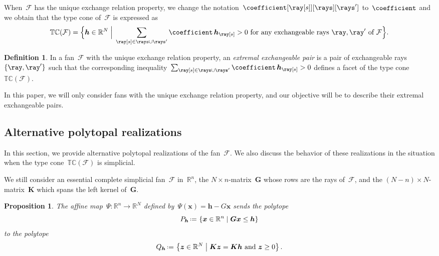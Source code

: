 \documentclass{amsart}
\newtheorem{proposition}[theorem]{Proposition}
\theoremstyle{definition}
\newtheorem{definition}[theorem]{Definition}
\newcommand{\R}{\mathbb{R}} %
\renewcommand{\b}[1]{{\boldsymbol{#1}}} %
\newcommand{\set}[2]{\left\{ #1 \;\middle|\; #2 \right\}} %
\newcommand{\Bigset}[2]{\Big\{ #1 \;\Big|\; #2 \Big\}} %
\newcommand{\eqdef}{\mbox{\,\raisebox{0.2ex}{\scriptsize\ensuremath{\mathrm:}}\ensuremath{=}\,}} %
\newcommand{\darkblue}{\color{darkblue}} %
\newcommand{\defn}[1]{\textsl{\darkblue #1}} %
\newcommand{\Fan}{\mathcal{F}} %
\newcommand{\typeCone}{\mathbb{TC}} %
\begin{document}
When~$\Fan$ has the unique exchange relation property, we change the notation~$\coefficient[{\ray[s]}][\rays][\rays']$ to~$\coefficient$ and we obtain that the type cone of~$\Fan$ is expressed as
\[
\typeCone(\Fan) = \Bigset{\b{h} \in \R^N}{\sum_{\ray[s] \in \rays \cup \rays'} \coefficient \, \b{h}_{\ray[s]} > 0 \text{ for any exchangeable rays~$\ray, \ray'$ of~$\Fan$}}.
\]

\begin{definition}
In a fan~$\Fan$ with the unique exchange relation property, an \defn{extremal exchangeable pair} is a pair of exchangeable rays~$\{\ray,\ray'\}$ such that the corresponding inequality~${\sum_{\ray[s] \in \rays \cup \rays'} \coefficient \, \b{h}_{\ray[s]} > 0}$ defines a facet of the type cone~$\typeCone(\Fan)$.
\end{definition}

In this paper, we will only consider fans with the unique exchange relation property, and our objective will be to describe their extremal exchangeable pairs.

\subsection{Alternative polytopal realizations}

In this section, we provide alternative polytopal realizations of the fan~$\Fan$.
We also discuss the behavior of these realizations in the situation when the type cone~$\typeCone(\Fan)$ is simplicial.

We still consider an essential complete simplicial fan~$\Fan$ in~$\R^n$, the $N \times n$-matrix~$\b{G}$ whose rows are the rays of~$\Fan$, and the $(N-n) \times N$-matrix~$\b{K}$ which spans the left kernel of~$\b{G}$.

\begin{proposition}
\label{prop:alternativePolytopalRealization}
The affine map~$\Psi: \R^n \to \R^N$ defined by~$\Psi(\b{x}) = \b{h} - G\b{x}$ sends the polytope
\[
P_\b{h} \eqdef \set{\b{x} \in \R^n}{\b{G}\b{x} \le \b{h}}
\]
to the polytope
\[
Q_\b{h} \eqdef \set{\b{z} \in \R^N}{\b{K}\b{z} = \b{K}\b{h} \text{ and } \b{z} \ge 0}.
\]
\end{proposition}
\end{document}
